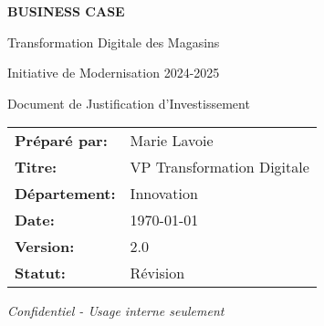 





\begin{titlepage}
\dollaramalogo[0.6]

\vspace{2cm}

\begin{center}
{\Huge\bfseries\color{DollaramaGreen} BUSINESS CASE}

\vspace{1cm}

{\Large\color{DollaramaGreen} Transformation Digitale des Magasins}

\vspace{0.5cm}

{\large\color{DollaramaGreen} Initiative de Modernisation 2024-2025}

\vspace{2cm}

{\large Document de Justification d'Investissement}

\vspace{3cm}

\begin{tabular}{ll}
\textbf{Préparé par:} & Marie Lavoie \\
\textbf{Titre:} & VP Transformation Digitale \\
\textbf{Département:} & Innovation \\
\textbf{Date:} & \today \\
\textbf{Version:} & 2.0 \\
\textbf{Statut:} & Révision
\end{tabular}

\vfill

\begin{center}
\textit{Confidentiel - Usage interne seulement}
\end{center}

\dollaramalogo[0.4]
\end{center}
\end{titlepage}

\setcounter{page}{1}


